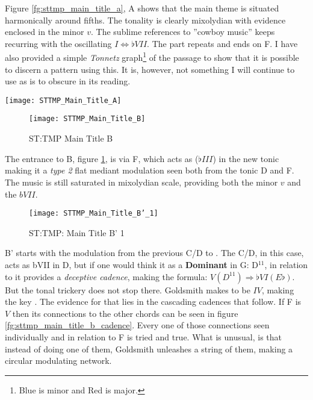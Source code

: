 Figure \ref{fg:sttmp_main_title_a}, A shows that the main theme is situated harmonically around fifths. The tonality is clearly mixolydian with evidence enclosed in the minor \(v\). The sublime references to ''cowboy music'' keeps recurring with the oscillating \(I \Leftrightarrow \flat{VII}\). The part repeats and ends on F. I have also provided a simple \textit{Tonnetz} graph\footnote{Blue is minor and Red is major.} of the passage to show that it is possible to discern a pattern using this. It is, however, not something I will continue to use as is to obscure in its reading. 

\begin{figure*}
\center
\texttt{[image: STTMP\_Main\_Title\_A]}
	\caption{ST:TMP: Main Title A}
	\label{fg:sttmp_main_title_a}
\end{figure*}


\begin{figure}[h!]
\center
\texttt{[image: STTMP\_Main\_Title\_B]}
	\caption{ST:TMP Main Title B}
	\label{fg:sttmp_main_title_b}
\end{figure}

The entrance to B, figure \ref{fg:sttmp_main_title_b}, is via F, which acts as (\(\flat{III}\)) in the new tonic making it a \textit{type 2} flat mediant modulation seen both from the tonic D and F. The music is still saturated in mixolydian scale, providing both the minor \(v\) and the \(bVII\).

\begin{figure}[h!]
\center
\texttt{[image: STTMP\_Main\_Title\_B'\_1]}
	\caption{ST:TMP: Main Title B' 1}
	\label{fg:sttmp_main_title_b_1}
\end{figure}

B' starts with the modulation from the previous C/D  to \eflat. The C/D, in this case, acts as bVII in D, but if one would think it as a \textbf{Dominant} in G: D\(^{11}\), in relation to \eflat it provides a \textit{deceptive cadence}, making the formula: \(V(D^{11})\Rightarrow{\flat}VI(E{\flat})\). But the tonal trickery does not stop there. Goldsmith makes \eflat to be \(IV\), making the key \bflat. The evidence for that lies in the cascading cadences that follow. If F is \(V\) then its connections to the other chords can be seen in figure \ref{fg:sttmp_main_title_b_cadence}. Every one of those connections seen individually and in relation to F is tried and true. What is unusual, is that instead of doing one of them, Goldsmith unleashes a string of them, making a circular modulating network.

